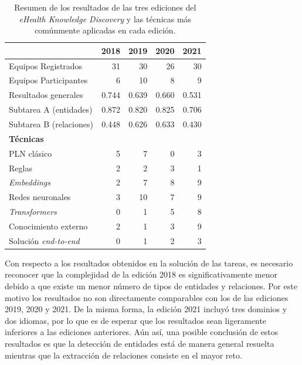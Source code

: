 \begin{table}[htb]\centering
    \begin{tabular}{lrrrr}
        \toprule
                                     & \bf 2018 & \bf 2019 & \bf 2020 & \bf 2021 \\
        \midrule
        Equipos Registrados          & 31       & 30       & 26       & 30       \\
        Equipos Participantes        & 6        & 10       & 8        & 9        \\
        \midrule
        Resultados generales         & 0.744    & 0.639    & 0.660    & 0.531    \\
        Subtarea A (entidades)       & 0.872    & 0.820    & 0.825    & 0.706    \\
        Subtarea B (relaciones)      & 0.448    & 0.626    & 0.633    & 0.430    \\
        \midrule
        \textbf{Técnicas}            &          &          &          &          \\
        PLN clásico                  & 5        & 7        & 0        & 3        \\
        Reglas                       & 2        & 2        & 3        & 1        \\
        \textit{Embeddings}          & 2        & 7        & 8        & 9        \\
        Redes neuronales             & 3        & 10       & 7        & 9        \\
        \textit{Transformers}        & 0        & 1        & 5        & 8        \\
        Conocimiento externo         & 2        & 1        & 3        & 9        \\
        Solución \textit{end-to-end} & 0        & 1        & 2        & 3        \\
        \bottomrule
    \end{tabular}
    \caption[Resultados del \textit{eHealth Knowledge Discovery}]{Resumen de los resultados de las tres ediciones del \textit{eHealth Knowledge Discovery} y las técnicas más comúnmente aplicadas en cada edición.\label{tab:results-challenge}
    }\end{table}

Con respecto a los resultados obtenidos en la solución de las tareas, es necesario reconocer que la complejidad de la edición 2018 es significativamente menor debido a que existe un menor número de tipos de entidades y relaciones.
Por este motivo los resultados no son directamente comparables con los de las ediciones 2019, 2020 y 2021.
De la misma forma, la edición 2021 incluyó tres dominios y dos idiomas, por lo que es de esperar que los resultados sean ligeramente inferiores a las ediciones anteriores.
Aún así, una posible conclusión de estos resultados es que la detección de entidades está de manera general resuelta mientras que la extracción de relaciones consiste en el mayor reto.

